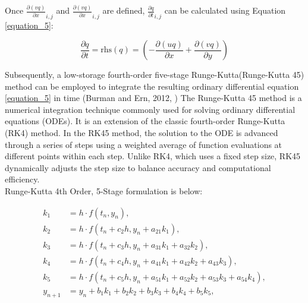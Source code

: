 \documentclass{article}
\begin{document}
Once $\frac{\partial (vq)}{\partial x}_{i,j}$ and $\frac{\partial (vq)}{\partial x}_{i,j}$ are defined, $\frac{\partial q}{\partial t}_{i,j}$ can be calculated using Equation \ref{equation_5}:             

\begin{equation} %
    \frac{\partial q}{\partial t} = \text{rhs}(q) = \left(-\frac{\partial (uq)}{\partial x} + \frac{\partial (vq)}{\partial y}\right) 
    \label{equation_5}
\end{equation}

Subsequently, a low-storage fourth-order five-stage Runge-Kutta(Runge-Kutta 45) method can be employed to integrate the resulting ordinary differential equation \ref{equation_5} in time (Burman and Ern, 2012, \cite{burman2012implicit})
The Runge-Kutta 45 method is a numerical integration technique commonly used for solving ordinary differential equations (ODEs). It is an extension of the classic fourth-order Runge-Kutta (RK4) method. In the RK45 method, the solution to the ODE is advanced through a series of steps using a weighted average of function evaluations at different points within each step. Unlike RK4, which uses a fixed step size, RK45 dynamically adjusts the step size to balance accuracy and computational efficiency.\\

Runge-Kutta 4th Order, 5-Stage formulation is below:

\begin{equation}
\begin{aligned}
    k_1 &= h \cdot f(t_n, y_n), \\
    k_2 &= h \cdot f(t_n + c_2h, y_n + a_{21}k_1), \\
    k_3 &= h \cdot f(t_n + c_3h, y_n + a_{31}k_1 + a_{32}k_2), \\
    k_4 &= h \cdot f(t_n + c_4h, y_n + a_{41}k_1 + a_{42}k_2 + a_{43}k_3), \\
    k_5 &= h \cdot f(t_n + c_5h, y_n + a_{51}k_1 + a_{52}k_2 + a_{53}k_3 + a_{54}k_4), \\
    y_{n+1} &= y_n + b_1k_1 + b_2k_2 + b_3k_3 + b_4k_4 + b_5k_5,
\end{aligned}
\end{equation}
\end{document}
